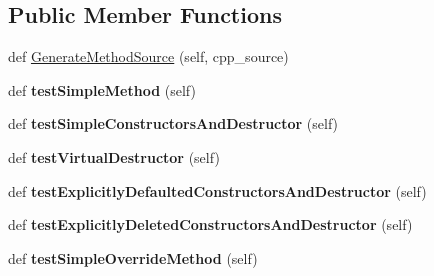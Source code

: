 \subsection*{Public Member Functions}
\begin{DoxyCompactItemize}
\item 
def \mbox{\hyperlink{classcpp_1_1gmock__class__test_1_1_generate_methods_test_af96a6c9fd394f7e27cf24f86814549c9}{Generate\+Method\+Source}} (self, cpp\+\_\+source)
\item 
\mbox{\label{classcpp_1_1gmock__class__test_1_1_generate_methods_test_a3ece43a88823e3fe1b4731819505bd61}} 
def {\bfseries test\+Simple\+Method} (self)
\item 
\mbox{\label{classcpp_1_1gmock__class__test_1_1_generate_methods_test_abb0adf9fa7afd25d63964a9075af1414}} 
def {\bfseries test\+Simple\+Constructors\+And\+Destructor} (self)
\item 
\mbox{\label{classcpp_1_1gmock__class__test_1_1_generate_methods_test_a3095f7046a089b3c8a13e7e8161a2ab2}} 
def {\bfseries test\+Virtual\+Destructor} (self)
\item 
\mbox{\label{classcpp_1_1gmock__class__test_1_1_generate_methods_test_a0a2a15e9eb43aff0fec7e89a81c30987}} 
def {\bfseries test\+Explicitly\+Defaulted\+Constructors\+And\+Destructor} (self)
\item 
\mbox{\label{classcpp_1_1gmock__class__test_1_1_generate_methods_test_a4e6c2d2de1e21e63672ebbb75676c45c}} 
def {\bfseries test\+Explicitly\+Deleted\+Constructors\+And\+Destructor} (self)
\item 
\mbox{\label{classcpp_1_1gmock__class__test_1_1_generate_methods_test_a2b1501cf9517acbeb48d11e9d8992a9b}} 
def {\bfseries test\+Simple\+Override\+Method} (self)
\item 
\mbox{\label{classcpp_1_1gmock__class__test_1_1_generate_methods_test_ad8cb9c2f99fa65c7d3fee054dde0e30d}} 

\end{DoxyCompactItemize}
